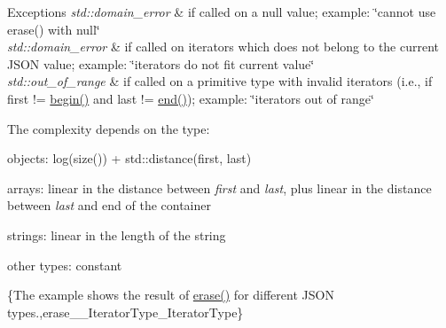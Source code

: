 \begin{DoxyExceptions}{Exceptions}
{\em std\-::domain\-\_\-error} & if called on a {\ttfamily null} value; example\-: {\ttfamily \char`\"{}cannot use
erase() with null\char`\"{}} \\
\hline
{\em std\-::domain\-\_\-error} & if called on iterators which does not belong to the current J\-S\-O\-N value; example\-: {\ttfamily \char`\"{}iterators do not fit current value\char`\"{}} \\
\hline
{\em std\-::out\-\_\-of\-\_\-range} & if called on a primitive type with invalid iterators (i.\-e., if {\ttfamily first != \hyperlink{classnlohmann_1_1basic__json_ad4e381c54039607be08d7af41a1f6ad1}{begin()}} and {\ttfamily last != \hyperlink{classnlohmann_1_1basic__json_a12ccf14d39ddae52f6c7e126105a230b}{end()}}); example\-: {\ttfamily \char`\"{}iterators out of range\char`\"{}}\\
\hline
\end{DoxyExceptions}
The complexity depends on the type\-:
\begin{DoxyItemize}
\item objects\-: {\ttfamily log(size()) + std\-::distance(first, last)}
\item arrays\-: linear in the distance between {\itshape first} and {\itshape last}, plus linear in the distance between {\itshape last} and end of the container
\item strings\-: linear in the length of the string
\item other types\-: constant
\end{DoxyItemize}

\{The example shows the result of {\ttfamily \hyperlink{classnlohmann_1_1basic__json_a45e789042a23138eba2b69f34df9fc45}{erase()}} for different J\-S\-O\-N types.,erase\-\_\-\-\_\-\-Iterator\-Type\-\_\-\-Iterator\-Type\}

